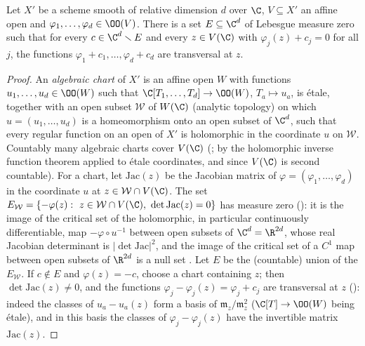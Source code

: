 \begin{proposition}\label{pf:hlf-cech:sard}
Let $X'$ be a scheme smooth of relative dimension $d$ over $\C$, $V\subseteq X'$ an affine open and $\varphi_1,\dots,\varphi_d\in\OO(V)$. There is
a set $E\subseteq\C^d$ of Lebesgue measure zero such that for every $c\in\C^d\smallsetminus E$ and every $z\in V(\C)$ with $\varphi_j(z)+c_j=0$
for all $j$, the functions $\varphi_1+c_1,\dots,\varphi_d+c_d$ are transversal at $z$.
\end{proposition}

\begin{proof}
An \emph{algebraic chart} of $X'$ is an affine open $W$ with functions $u_1,\dots,u_d\in\OO(W)$ such that $\C[T_1,\dots,T_d]\to\OO(W)$,
$T_a\mapsto u_a$, is \'etale, together with an open subset $\mathcal W$ of $W(\C)$ (analytic topology) on which $u=(u_1,\dots,u_d)$ is a
homeomorphism onto an open subset of $\C^d$, such that every regular function on an open of $X'$ is holomorphic in the coordinate $u$ on
$\mathcal W$. Countably many algebraic charts cover $V(\C)$ (; by the holomorphic inverse
function theorem applied to \'etale coordinates, and since $V(\C)$ is second countable). For a chart, let $\mathrm{Jac}(z)$ be the
Jacobian matrix of $\varphi=(\varphi_1,\dots,\varphi_d)$ in the coordinate $u$ at $z\in\mathcal W\cap V(\C)$. The set
$E_{\mathcal W}=\{-\varphi(z):\ z\in\mathcal W\cap V(\C),\ \det\mathrm{Jac}(z)=0\}$ has measure zero
(): it is the image of the critical set of the holomorphic, in particular
continuously differentiable, map $-\varphi\circ u^{-1}$ between open subsets of $\C^d=\R^{2d}$, whose real Jacobian determinant is
$|\det\mathrm{Jac}|^2$, and the image of the critical set of a $C^1$ map between open subsets of $\R^{2d}$ is a null set
\cite[Thm.~3-14]{Spivak1965}. Let $E$ be the (countable) union of the $E_{\mathcal W}$. If $c\notin E$ and $\varphi(z)=-c$, choose a chart
containing $z$; then $\det\mathrm{Jac}(z)\ne0$, and the functions $\varphi_j-\varphi_j(z)=\varphi_j+c_j$ are transversal at $z$
(): indeed the classes of $u_a-u_a(z)$ form a basis of $\mathfrak m_z/\mathfrak m_z^2$
($\C[T]\to\OO(W)$ being \'etale), and in this basis the classes of $\varphi_j-\varphi_j(z)$ have the invertible matrix $\mathrm{Jac}(z)$.
\end{proof}

